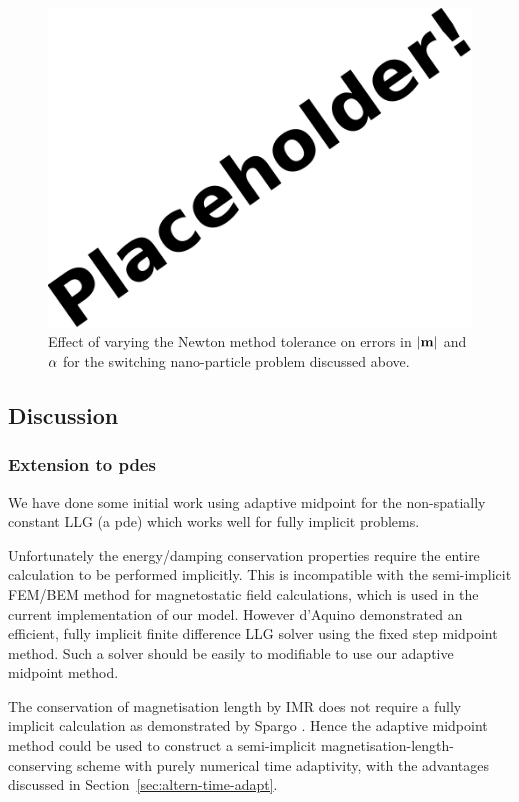 \begin{figure}[ht!]
  \centering
  \includegraphics{images/placeholder}
  \caption{Effect of varying the Newton method tolerance on errors in $\lvert \mathbf{m} \rvert$ and $\alpha$  for the switching nano-particle problem discussed above.}
  \label{fig:newton-tol-errors-mp}
\end{figure}


\subsection{Discussion}

\subsubsection{Extension to pdes}

We have done some initial work using adaptive midpoint for the non-spatially constant LLG (\ie a pde) which works well for fully implicit problems.

Unfortunately the energy/damping conservation properties require the entire calculation to be performed implicitly.
This is incompatible with the semi-implicit FEM/BEM method for magnetostatic field calculations,\cite{Koehler1997} which is used in the current implementation of our model.
However d'Aquino \etal demonstrated an efficient, fully implicit finite difference LLG solver using the fixed step midpoint method\cite{DAquino2005}.
Such a solver should be easily to modifiable to use our adaptive midpoint method.

The conservation of magnetisation length by IMR does not require a fully implicit calculation as demonstrated by Spargo \etal\cite{Spargo2003a}.
Hence the adaptive midpoint method could be used to construct a semi-implicit magnetisation-length-conserving scheme with purely numerical time adaptivity, with the advantages discussed in Section~\ref{sec:altern-time-adapt}.


